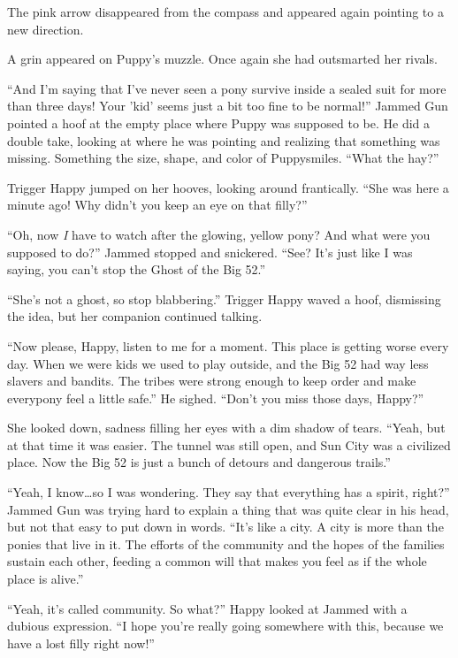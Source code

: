 The pink arrow disappeared from the compass and appeared again pointing to a new direction.

A grin appeared on Puppy's muzzle. Once again she had outsmarted her rivals.


\horizonline


``And I'm saying that I've never seen a pony survive inside a sealed suit for more than three days! Your 'kid' seems just a bit too fine to be normal!'' Jammed Gun pointed a hoof at the empty place where Puppy was supposed to be. He did a double take, looking at where he was pointing and realizing that something was missing. Something the size, shape, and color of Puppysmiles. ``What the hay?''

Trigger Happy jumped on her hooves, looking around frantically. ``She was here a minute ago! Why didn't you keep an eye on that filly?''

``Oh, now \emph{I}\/ have to watch after the glowing, yellow pony? And what were you supposed to do?'' Jammed stopped and snickered. ``See? It's just like I was saying, you can't stop the Ghost of the Big 52.''

``She's not a ghost, so stop blabbering.'' Trigger Happy waved a hoof, dismissing the idea, but her companion continued talking.

``Now please, Happy, listen to me for a moment. This place is getting worse every day. When we were kids we used to play outside, and the Big 52 had way less slavers and bandits. The tribes were strong enough to keep order and make everypony feel a little safe.'' He sighed. ``Don't you miss those days, Happy?''

She looked down, sadness filling her eyes with a dim shadow of tears. ``Yeah, but at that time it was easier. The tunnel was still open, and Sun City was a civilized place. Now the Big 52 is just a bunch of detours and dangerous trails.''

``Yeah, I know\dots so I was wondering. They say that everything has a spirit, right?'' Jammed Gun was trying hard to explain a thing that was quite clear in his head, but not that easy to put down in words. ``It's like a city. A city is more than the ponies that live in it. The efforts of the community and the hopes of the families sustain each other, feeding a common will that makes you feel as if the whole place is alive.''

``Yeah, it's called community. So what?'' Happy looked at Jammed with a dubious expression. ``I hope you're really going somewhere with this, because we have a lost filly right now!''

